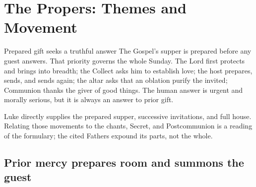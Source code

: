 \section*{The Propers: Themes and Movement}

\begin{massbox}{Prepared gift seeks a truthful answer}
The Gospel's supper is prepared before any guest answers. That priority governs the whole Sunday. The Lord first protects and brings into breadth; the Collect asks him to establish love; the host prepares, sends, and sends again; the altar asks that an oblation purify the invited; Communion thanks the giver of good things. The human answer is urgent and morally serious, but it is always an answer to prior gift.
\end{massbox}

\begin{center}
\end{center}

\noindent Luke directly supplies the prepared supper, successive invitations, and full house. Relating those movements to the chants, Secret, and Postcommunion is a reading of the formulary; the cited Fathers expound its parts, not the whole.

\subsection*{Prior mercy prepares room and summons the guest\enspace{}}


